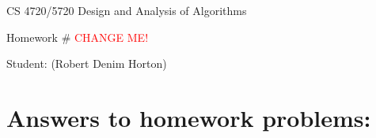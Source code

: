 \documentclass[11pt]{article}
\begin{document}
 

\rhead{\today}

\begin{center}\begin{Large}
CS 4720/5720 Design and Analysis of Algorithms

Homework \#  \textcolor{red}{CHANGE ME!}

Student: (Robert Denim Horton)
\end{Large}
\end{center}


\section*{Answers to homework problems:}
\end{document}

